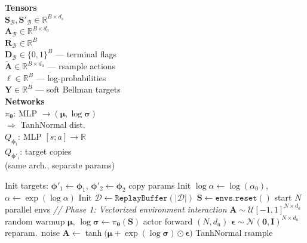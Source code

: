 \documentclass[11pt]{article}
\begin{document}
\begin{algorithm}[p]
\begin{minipage}[t]{0.28\linewidth}
\vspace{6pt}
\textbf{Tensors} \\[2pt]
$\mathbf{S}_\mathcal{B}, \mathbf{S}'_\mathcal{B} \in \mathbb{R}^{B \times d_s}$ \\
$\mathbf{A}_\mathcal{B} \in \mathbb{R}^{B \times d_a}$ \\
$\mathbf{R}_\mathcal{B} \in \mathbb{R}^{B}$ \\
$\mathbf{D}_\mathcal{B} \in \{0,1\}^{B}$ --- terminal flags \\
$\tilde{\mathbf{A}} \in \mathbb{R}^{B \times d_a}$ --- rsample actions \\
$\boldsymbol{\ell} \in \mathbb{R}^{B}$ --- log-probabilities \\
$\mathbf{Y} \in \mathbb{R}^{B}$ --- soft Bellman targets \\[3pt]
\textbf{Networks} \\[2pt]
$\pi_{\boldsymbol{\theta}}$: MLP $\to (\boldsymbol{\mu}, \log\boldsymbol{\sigma})$ \\
\hspace*{1em}$\Rightarrow$ TanhNormal dist. \\
$Q_{\boldsymbol{\phi}_i}$: MLP $[s;a] \to \mathbb{R}$ \\
$Q_{\boldsymbol{\phi}'_i}$: target copies \\
\hspace*{1em}(same arch., separate params)
\end{minipage}%
\hfill
\vrule
\hfill
\begin{minipage}[t]{0.68\linewidth}
\begin{algorithmic}[1]
\State Init targets: $\boldsymbol{\phi}'_1 \gets \boldsymbol{\phi}_1$, \; $\boldsymbol{\phi}'_2 \gets \boldsymbol{\phi}_2$ \hfill copy params
\State Init $\log\alpha \gets \log(\alpha_0)$, \; $\alpha \gets \exp(\log\alpha)$
\State Init $\mathcal{D} \gets \texttt{ReplayBuffer}(|\mathcal{D}|)$
\State $\mathbf{S} \gets \texttt{envs.reset}()$ \hfill start $N$ parallel envs
    \Statex \hspace{\algorithmicindent}\textit{// Phase 1: Vectorized environment interaction}
        \State $\mathbf{A} \sim \mathcal{U}[-1, 1]^{N \times d_a}$ \hfill random warmup
    \Else
        \State $\boldsymbol{\mu},\, \log\boldsymbol{\sigma} \gets \pi_{\boldsymbol{\theta}}(\mathbf{S})$ \hfill actor forward $(N, d_a)$
        \State $\boldsymbol{\epsilon} \sim \mathcal{N}(\mathbf{0}, \mathbf{I})^{N \times d_a}$ \hfill reparam.\ noise
        \State $\mathbf{A} \gets \tanh\!\big(\boldsymbol{\mu} + \exp(\log\boldsymbol{\sigma}) \odot \boldsymbol{\epsilon}\big)$ \hfill TanhNormal rsample

\end{algorithmic}
\end{minipage}
\end{algorithm}
\end{document}
